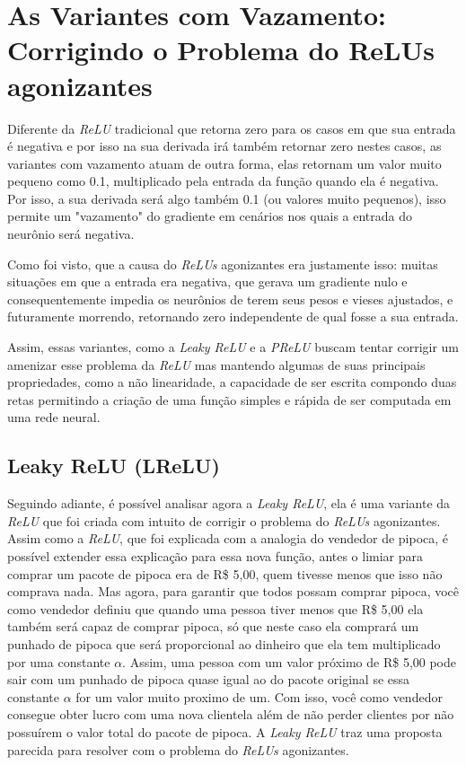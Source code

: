 \section{As Variantes com Vazamento: Corrigindo o Problema do ReLUs agonizantes}

Diferente da \textit{ReLU} tradicional que retorna zero para os casos em que sua entrada é negativa e por isso na sua derivada irá também retornar zero nestes casos, as variantes com vazamento atuam de outra forma, elas retornam um valor muito pequeno como 0.1, multiplicado pela entrada da função quando ela é negativa. Por isso, a sua derivada será algo também 0.1 (ou valores muito pequenos), isso permite um "vazamento" do gradiente em cenários nos quais a entrada do neurônio será negativa.

Como foi visto, que a causa do \textit{ReLUs} agonizantes era justamente isso: muitas situações em que a entrada era negativa, que gerava um gradiente nulo e consequentemente impedia os neurônios de terem seus pesos e vieses ajustados, e futuramente morrendo, retornando zero independente de qual fosse a sua entrada.

Assim, essas variantes, como a \textit{Leaky ReLU} e a \textit{PReLU} buscam tentar corrigir um amenizar esse problema da \textit{ReLU} mas mantendo algumas de suas principais propriedades, como a não linearidade, a capacidade de ser escrita compondo duas retas permitindo a criação de uma função simples e rápida de ser computada em uma rede neural.

\subsection{Leaky ReLU (LReLU)} 

Seguindo adiante, é possível analisar agora a \textit{Leaky ReLU}, ela é uma variante da \textit{ReLU} que foi criada com intuito de corrigir o problema do \textit{ReLUs} agonizantes. Assim como a \textit{ReLU}, que foi explicada com a analogia do vendedor de pipoca, é possível extender essa explicação para essa nova função, antes o limiar para comprar um pacote de pipoca era de R\$ 5,00, quem tivesse menos que isso não comprava nada. Mas agora, para garantir que todos possam comprar pipoca, você como vendedor definiu que quando uma pessoa tiver menos que R\$ 5,00 ela também será capaz de comprar pipoca, só que neste caso ela comprará um punhado de pipoca que será proporcional ao dinheiro que ela tem multiplicado por uma constante $\alpha$. Assim, uma pessoa com um valor próximo de R\$ 5,00 pode sair com um punhado de pipoca quase igual ao do pacote original se essa constante $\alpha$ for um valor muito proximo de um. Com isso, você como vendedor consegue obter lucro com uma nova clientela além de não perder clientes por não possuírem o valor total do pacote de pipoca. A \textit{Leaky ReLU} traz uma proposta parecida para resolver com o problema do \textit{ReLUs} agonizantes.

